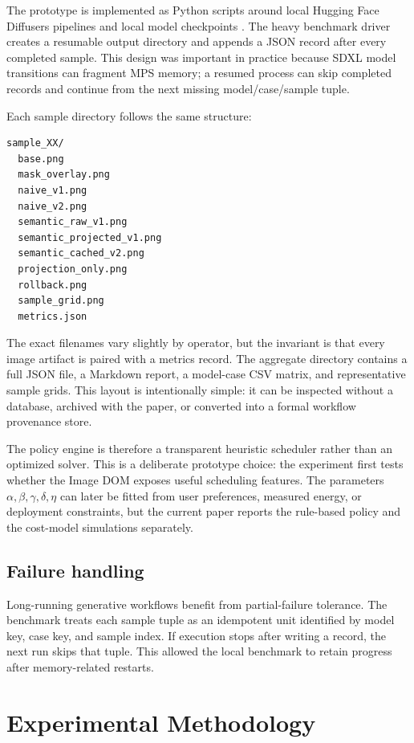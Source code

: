 \documentclass[final,5p,times,number,sort&compress]{elsarticle}
\newcommand{\imageDOM}{Image DOM}
\begin{document}
The prototype is implemented as Python scripts around local Hugging Face Diffusers pipelines and local model checkpoints \citep{huggingfaceDiffusers}. The heavy benchmark driver creates a resumable output directory and appends a JSON record after every completed sample. This design was important in practice because SDXL model transitions can fragment MPS memory; a resumed process can skip completed records and continue from the next missing model/case/sample tuple.

Each sample directory follows the same structure:
\begin{verbatim}
sample_XX/
  base.png
  mask_overlay.png
  naive_v1.png
  naive_v2.png
  semantic_raw_v1.png
  semantic_projected_v1.png
  semantic_cached_v2.png
  projection_only.png
  rollback.png
  sample_grid.png
  metrics.json
\end{verbatim}
The exact filenames vary slightly by operator, but the invariant is that every image artifact is paired with a metrics record. The aggregate directory contains a full JSON file, a Markdown report, a model-case CSV matrix, and representative sample grids. This layout is intentionally simple: it can be inspected without a database, archived with the paper, or converted into a formal workflow provenance store.

The policy engine is therefore a transparent heuristic scheduler rather than an optimized solver. This is a deliberate prototype choice: the experiment first tests whether the \imageDOM{} exposes useful scheduling features. The parameters \(\alpha,\beta,\gamma,\delta,\eta\) can later be fitted from user preferences, measured energy, or deployment constraints, but the current paper reports the rule-based policy and the cost-model simulations separately.

\subsection{Failure handling}

Long-running generative workflows benefit from partial-failure tolerance. The benchmark treats each sample tuple as an idempotent unit identified by model key, case key, and sample index. If execution stops after writing a record, the next run skips that tuple. This allowed the local benchmark to retain progress after memory-related restarts.

\section{Experimental Methodology}
\end{document}

